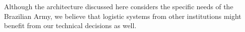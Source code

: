 Although the architecture discussed here considers the specific needs of the Brazilian Army, 
we believe that logistic systems from other institutions might benefit from our technical 
decisions as well.



